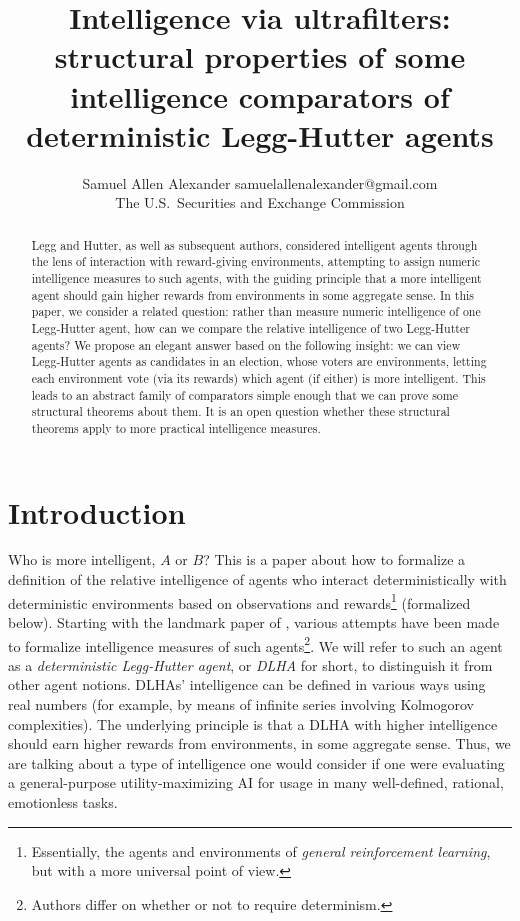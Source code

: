 \documentclass[twoside,11pt]{article}
\author{\name Samuel Allen Alexander
\email samuelallenalexander@gmail.com \\
\addr The U.S.\ Securities and Exchange Commission}
\title{Intelligence via ultrafilters: structural properties of some intelligence
comparators of deterministic Legg-Hutter agents}
\begin{document}
\maketitle

\begin{abstract}
    Legg and Hutter, as well as subsequent authors, considered intelligent agents
    through the lens of interaction with reward-giving
    environments, attempting to
    assign numeric intelligence measures to such agents, with the guiding
    principle that a more intelligent agent should gain higher rewards
    from environments in some aggregate sense.
    In this paper, we consider a related question: rather than measure
    numeric intelligence of one Legg-Hutter agent, how can we compare the
    relative intelligence
    of two Legg-Hutter agents? We propose an elegant answer based on
    the following insight:
    we can view Legg-Hutter agents as candidates in an election, whose voters are
    environments, letting each environment vote (via its rewards) which
    agent (if either) is more intelligent. This leads to an abstract
    family of comparators simple enough that we can prove
    some structural theorems about them. It is an open question whether
    these structural theorems apply to more practical intelligence measures.
\end{abstract}

\section{Introduction}

Who is more intelligent, $A$ or $B$? This is a paper about
how to formalize a definition of the relative intelligence of
agents who interact deterministically with deterministic
environments based on observations and
rewards\footnote{Essentially, the agents and environments
of \emph{general reinforcement learning}, but with a more universal
point of view.}
(formalized below).
Starting with the landmark paper of \citet{hutter2007}, various
attempts \citep{hernandez, hibbard, legg2013approximation} have been
made to formalize intelligence measures of such
agents\footnote{Authors differ on whether or not to require determinism.}.
We will refer to such an agent as a \emph{deterministic Legg-Hutter agent},
or \emph{DLHA} for short, to distinguish it from other agent notions.
DLHAs' intelligence can be defined in
various ways using real numbers (for example, by
means of infinite series involving Kolmogorov complexities).
The underlying principle is that a DLHA with higher intelligence should
earn higher rewards from environments, in some aggregate sense.
Thus, we are talking about a type of intelligence one would consider if
one were evaluating a general-purpose utility-maximizing AI for usage
in many well-defined, rational, emotionless tasks.
\end{document}
